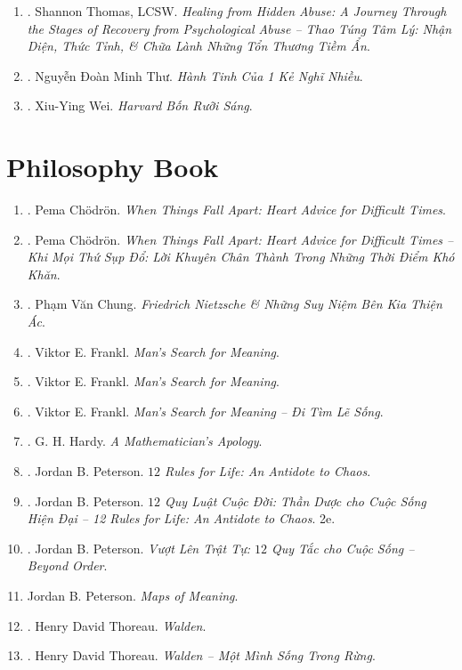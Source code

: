 \documentclass{article}
\begin{document}
\begin{enumerate}
	\item \cite{Thomas2021}. Shannon Thomas, LCSW. \textit{Healing from Hidden Abuse: A Journey Through the Stages of Recovery from Psychological Abuse -- Thao Túng Tâm Lý: Nhận Diện, Thức Tỉnh, \& Chữa Lành Những Tổn Thương Tiềm Ẩn}.\hfill{\sf[finished]}
	\item \cite{Thu2022}. Nguyễn Đoàn Minh Thư. \textit{Hành Tinh Của 1  Kẻ Nghĩ Nhiều}.\hfill{\sf[finished]}
	\item \cite{Wei2022}. Xiu-Ying Wei. \textit{Harvard Bốn Rưỡi Sáng}.\hfill{\sf[finished]}
\end{enumerate}


\section{Philosophy Book}

\begin{enumerate}
	\item \cite{Chodron2002}. Pema Ch\"odr\"on. \textit{When Things Fall Apart: Heart Advice for Difficult Times}.\hfill{\sf[reading]}
	\item \cite{Chodron2021}. Pema Ch\"odr\"on. \textit{When Things Fall Apart: Heart Advice for Difficult Times -- Khi Mọi Thứ Sụp Đổ: Lời Khuyên Chân Thành Trong Những Thời Điểm Khó Khăn}.\hfill{\sf[finished]}
	\item \cite{Chung2022}. Phạm Văn Chung. \textit{Friedrich Nietzsche \& Những Suy Niệm Bên Kia Thiện Ác}.\hfill{\sf[finished]}
	\item \cite{Frankl2013}. Viktor E. Frankl. \textit{Man's Search for Meaning}.\hfill{\sf[reading]}
	\item \cite{Frankl2017}. Viktor E. Frankl. \textit{Man's Search for Meaning}.\hfill{\sf[reading]}
	\item \cite{Frankl2022}. Viktor E. Frankl. \textit{Man's Search for Meaning -- Đi Tìm Lẽ Sống}.\hfill{\sf[finished]}
	\item \cite{Hardy1940, Hardy1992, Hardy2022}. G. H. Hardy. \textit{A Mathematician's Apology}.\hfill{\sf[finished]}
	\item \cite{Peterson2018}. Jordan B. Peterson. \textit{$12$ Rules for Life: An Antidote to Chaos}.\hfill{\sf[reading]}
	\item \cite{Peterson2022a}. Jordan B. Peterson. \textit{$12$ Quy Luật Cuộc Đời: Thần Dược cho Cuộc Sống Hiện Đại -- 12 Rules for Life: An Antidote to Chaos}. 2e.\hfill{\sf[finished]}
	\item \cite{Peterson2022b}. Jordan B. Peterson. \textit{Vượt Lên Trật Tự: $12$ Quy Tắc cho Cuộc Sống -- Beyond Order}.\hfill{\sf[finished]}
	\item Jordan B. Peterson. \textit{Maps of Meaning}.\hfill{\sf[reading]}
	\item \cite{Thoreau2014}. Henry David Thoreau. \textit{Walden}.\hfill{\sf[reading]}
	\item \cite{Thoreau2023}. Henry David Thoreau. \textit{Walden -- Một Mình Sống Trong Rừng}.\hfill{\sf[finished]}
\end{enumerate}
\end{document}
